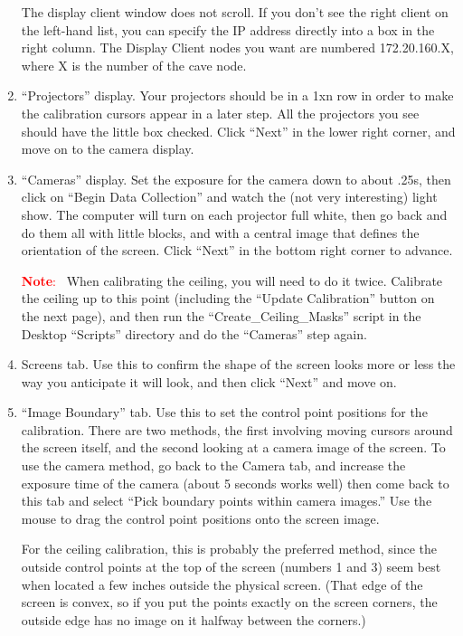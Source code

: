 \documentclass[11pt]{article}
\newenvironment{note}[1][Note]{\begin{lrbox}{\notebox}%
    \begin{minipage}{0.9\columnwidth}\textcolor{red}{\textbf{#1}:~}}%
    {\end{minipage}\end{lrbox}\begin{center}\setlength{\fboxsep}{8pt}%
    \fbox{\usebox{\notebox}}\end{center}}
\begin{document}
\begin{enumerate}
The display client window does not scroll.  If you don't see the right
client on the left-hand list, you can specify the IP address directly
into a box in the right column.  The Display Client nodes you want are
numbered 172.20.160.X, where X is the number of the cave node.

\item ``Projectors'' display.  Your projectors should be in a 1xn row in
  order to make the calibration cursors appear in a later step.  All
  the projectors you see should have the little box checked.  Click
  ``Next'' in the lower right corner, and move on to the camera
  display.

\item ``Cameras'' display.  Set the exposure for the camera down to about
  .25s, then click on ``Begin Data Collection'' and watch the (not very
  interesting) light show.  The computer will turn on each projector
  full white, then go back and do them all with little blocks, and
  with a central image that defines the orientation of the
  screen.  Click ``Next'' in the bottom right corner to advance.

\begin{note}
  When calibrating the ceiling, you will need to do it twice.
  Calibrate the ceiling up to this point (including the ``Update
  Calibration'' button on the next page), and then run the
  ``Create\_Ceiling\_Masks'' script in the Desktop ``Scripts''
  directory and do the ``Cameras'' step again.
\end{note}

\item Screens tab.  Use this to confirm the shape of the screen looks
  more or less the way you anticipate it will look, and then click
  ``Next'' and move on.

\item ``Image Boundary'' tab.  Use this to set the control point
  positions for the calibration.  There are two methods, the first
  involving moving cursors around the screen itself, and the second
  looking at a camera image of the screen.  To use the camera method,
  go back to the Camera tab, and increase the exposure time of the
  camera (about 5 seconds works well) then come back to this tab and
  select ``Pick boundary points within camera images.''  Use the mouse
  to drag the control point positions onto the screen image.

  For the ceiling calibration, this is probably the preferred method,
  since the outside control points at the top of the screen (numbers 1
  and 3) seem best when located a few inches outside the physical
  screen.  (That edge of the screen is convex, so if you put the
  points exactly on the screen corners, the outside edge has no image
  on it halfway between the corners.)


\end{enumerate}
\end{document}

